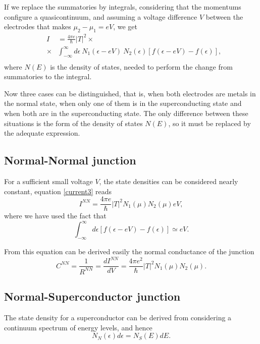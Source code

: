 \documentclass[twocolumn, twoside,a4paper,10pt]{article}
\begin{document}
If we replace the summatories by integrals, considering that the momentums configure a quasicontinuum, and assuming a voltage difference $V$ between the electrodes that makes $\mu_2-\mu_1=eV$, we get
\begin{eqnarray}\label{current3}
&I& = \frac{4\pi e}{\hbar}  |T|^2 \times
	\nonumber \\
	&\times& \int_{-\infty}^{\infty} d\epsilon\ N_1(\epsilon-eV)\ N_2(\epsilon) [f(\epsilon-eV)-f(\epsilon)],
	\nonumber \\
\end{eqnarray}
where $N(E)$ is the density of states, needed to perform the change from summatories to the integral.

Now three cases can be distinguished, that is, when both electrodes are metals in the normal state, when only one of them is in the superconducting state and when both are in the superconducting state. The only difference between these situations is the form of the density of states $N(E)$, so it must be replaced by the adequate expression.

\subsection{Normal-Normal junction}
For a sufficient small voltage $V$, the state densities can be considered nearly constant, equation \eqref{current3} reads
\begin{equation}\label{inn}
I^{NN} = \frac{4\pi e}{\hbar} |T|^2 N_1(\mu)N_2(\mu) eV,
\end{equation}
where we have used the fact that $$ \int_{-\infty}^{\infty}d\epsilon [f(\epsilon-eV)-f(\epsilon)] \simeq eV. $$

From this equation can be derived easily the normal conductance of the junction
\begin{equation}\label{cnn}
C^{NN} = \frac{1}{R^{NN}} = \frac{dI^{NN}}{dV} = \frac{4\pi e^2}{\hbar} |T|^2 N_1(\mu)N_2(\mu).
\end{equation}


\subsection{Normal-Superconductor junction} 
The state density for a superconductor can be derived from considering a continuum spectrum of energy levels, and hence
\begin{equation}
N_N(\epsilon) d\epsilon = N_S(E)dE.
\end{equation}
\end{document}
